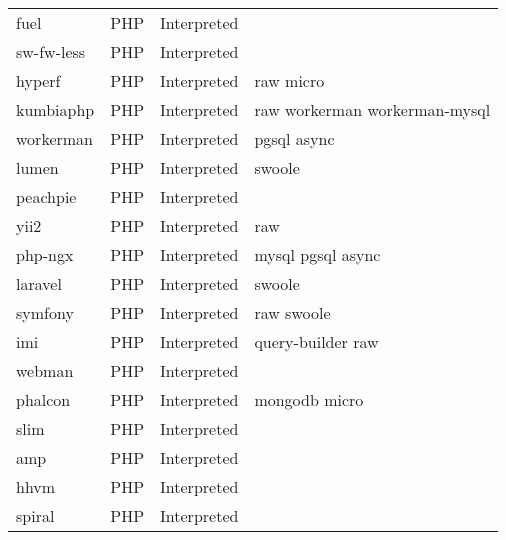 \begin{longtable}{llll}
    fuel             & PHP         & Interpreted &                                                    \\
    sw-fw-less       & PHP         & Interpreted &                                                    \\
    hyperf           & PHP         & Interpreted & raw micro                                          \\
    kumbiaphp        & PHP         & Interpreted & raw workerman workerman-mysql                      \\
    workerman        & PHP         & Interpreted & pgsql async                                        \\
    lumen            & PHP         & Interpreted & swoole                                             \\
    peachpie         & PHP         & Interpreted &                                                    \\
    yii2             & PHP         & Interpreted & raw                                                \\
    php-ngx          & PHP         & Interpreted & mysql pgsql async                                  \\
    laravel          & PHP         & Interpreted & swoole                                             \\
    symfony          & PHP         & Interpreted & raw swoole                                         \\
    imi              & PHP         & Interpreted & query-builder raw                                  \\
    webman           & PHP         & Interpreted &                                                    \\
    phalcon          & PHP         & Interpreted & mongodb micro                                      \\
    slim             & PHP         & Interpreted &                                                    \\
    amp              & PHP         & Interpreted &                                                    \\
    hhvm             & PHP         & Interpreted &                                                    \\
    spiral           & PHP         & Interpreted &                                                    \\

\end{longtable}
